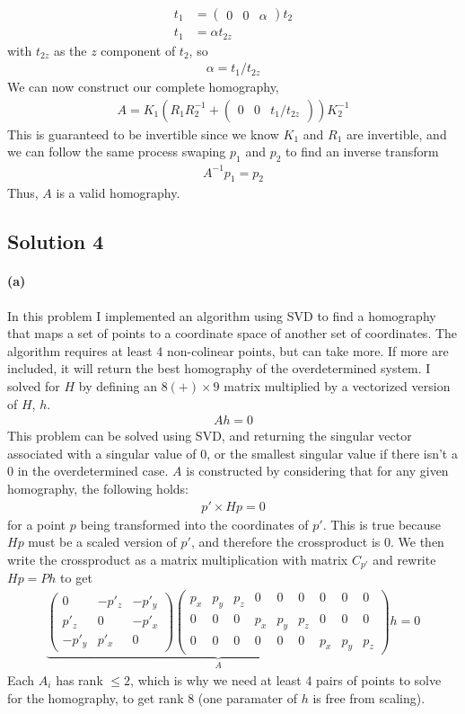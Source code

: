 \documentclass{article}
\newcommand{\solution}[1]{\clearpage \subsection*{Solution #1}}
\newcommand{\spart}[1]{\paragraph{(#1)}}
\begin{document}
\begin{align}
	t_1 &= \begin{pmatrix}
		0 & 0 & \alpha
	\end{pmatrix} t_2 \\
t_1 &= \alpha t_{2z}
\end{align}
with $t_{2z}$ as the $z$ component of $t_2$, so
\begin{align}
	\alpha = t_1/t_{2z}
\end{align}
We can now construct our complete homography,
\begin{align}
A = K_1\left(R_1R_2^{-1} + \begin{pmatrix}
	0 & 0 & t_1/t_{2z}
\end{pmatrix}\right) K_2^{-1}
\end{align}
This is guaranteed to be invertible since we know $K_1$ and $R_1$ are invertible, and we can follow the same process swaping $p_1$ and $p_2$ to find an inverse transform 
\begin{align}
	A^{-1}p_1 = p_2
\end{align}
Thus, $A$ is a valid homography. 

\solution{4}

\spart{a} In this problem I implemented an algorithm using SVD to find a homography that maps a set of points to a coordinate space of another set of coordinates. The algorithm requires at least 4 non-colinear points, but can take more. If more are included, it will return the best homography of the overdetermined system. I solved for $H$ by defining an $8(+)\times 9$ matrix multiplied by a vectorized version of $H$, $h$.
\begin{align}
	Ah = 0
\end{align}
This problem can be solved using SVD, and returning the singular vector associated with a singular value of 0, or the smallest singular value if there isn't a 0 in the overdetermined case. $A$ is constructed by considering that for any given homography, the following holds:
\begin{align}
	p'\times Hp = 0
\end{align}
for a point $p$ being transformed into the coordinates of $p'$. This is true because $Hp$ must be a scaled version of $p'$, and therefore the crossproduct is 0. We then write the crossproduct as a matrix multiplication with matrix $C_{p'}$ and rewrite $Hp = Ph$ to get
\begin{align}
	\underbrace{\begin{pmatrix}
		0 & -p'_z & -p'_y \\
		p'_z & 0 & -p'_x \\
		-p'_y & p'_x & 0
	\end{pmatrix} \begin{pmatrix}
	p_x & p_y & p_z &  0 & 0 & 0 & 	0 & 0 & 0 \\
	0 & 0 & 0 &  p_x & p_y & p_z &	0 & 0 & 0  \\
	0 & 0 & 0 & 	0 & 0 & 0 & p_x & p_y & p_z 
\end{pmatrix}}_A h = 0
\end{align}
Each $A_i$ has rank $\leq 2$, which is why we need at least 4 pairs of points to solve for the homography, to get rank 8 (one paramater of $h$ is free from scaling).
\end{document}
